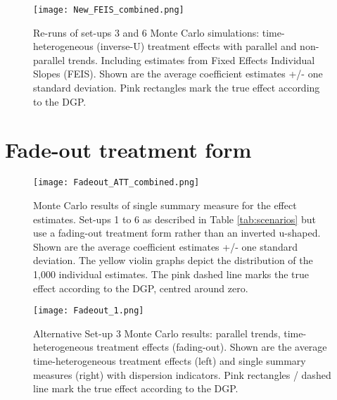 \clearpage

\begin{figure}[t]    \centering
    \texttt{[image: New\_FEIS\_combined.png]}
    \caption{Re-runs of set-ups 3 and 6 Monte Carlo simulations: time-heterogeneous (inverse-U) treatment effects with parallel and non-parallel trends. Including estimates from Fixed Effects Individual Slopes (FEIS). Shown are the average coefficient estimates +/- one standard deviation. Pink rectangles mark the true effect according to the DGP.}    \label{fig:feis}\end{figure}

\clearpage

\section{Fade-out treatment form} \label{suppl:fade-out}

\begin{figure}[h!]    \centering
    \texttt{[image: Fadeout\_ATT\_combined.png]}
    \caption{Monte Carlo results of single summary measure for the effect estimates. Set-ups 1 to 6 as described in Table \ref{tab:scenarios} but use a fading-out treatment form rather than an inverted u-shaped. Shown are the average coefficient estimates +/- one standard deviation. The yellow violin graphs depict the distribution of the 1,000 individual estimates. The pink dashed line marks the true effect according to the DGP, centred around zero.}    \label{fig:fig_att_fadeout}    \hypertarget{fig:fig_att_fadeout}{}\end{figure}


\begin{figure}[h!]    \texttt{[image: Fadeout\_1.png]} 
    \caption{Alternative Set-up 3 Monte Carlo results: parallel trends, time-heterogeneous treatment effects (fading-out). Shown are the average time-heterogeneous treatment effects (left) and single summary measures (right) with dispersion indicators. Pink rectangles / dashed line mark the true effect according to the DGP.}    \label{fig:fade-out}\end{figure}


